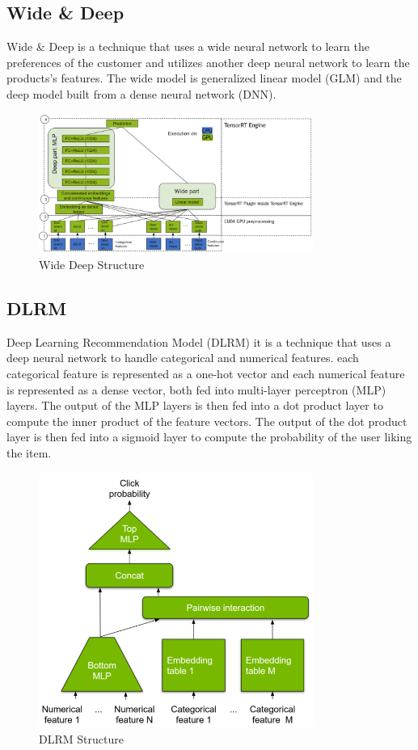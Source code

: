 \subsection{Wide \& Deep}
Wide \& Deep is a technique that uses a wide neural network to learn the preferences of the customer and utilizes another deep neural network to learn the products's features. The wide model is generalized linear model (GLM) and the deep model built from a dense neural network (DNN).
\begin{figure}[H]
    \centering
    \includegraphics[width=0.8\textwidth]{assets/wide_deep.png}
    \caption[Wide Deep Structure]{Wide Deep Structure \cite{NvidiaRecSys}}
    \label{fig:wide-deep}
\end{figure}

\subsection{DLRM}
Deep Learning Recommendation Model (DLRM) it is a technique that uses a deep neural network to handle categorical and numerical features. each categorical feature is represented as a one-hot vector and each numerical feature is represented as a dense vector, both fed into multi-layer perceptron (MLP) layers. The output of the MLP layers is then fed into a dot product layer to compute the inner product of the feature vectors. The output of the dot product layer is then fed into a sigmoid layer to compute the probability of the user liking the item.
\begin{figure}[H]
    \centering
    \includegraphics[width=0.8\textwidth]{assets/dlrm.png}
    \caption[DLRM Structure]{DLRM Structure \cite{NvidiaRecSys}}
    \label{fig:dlrm}
\end{figure}
